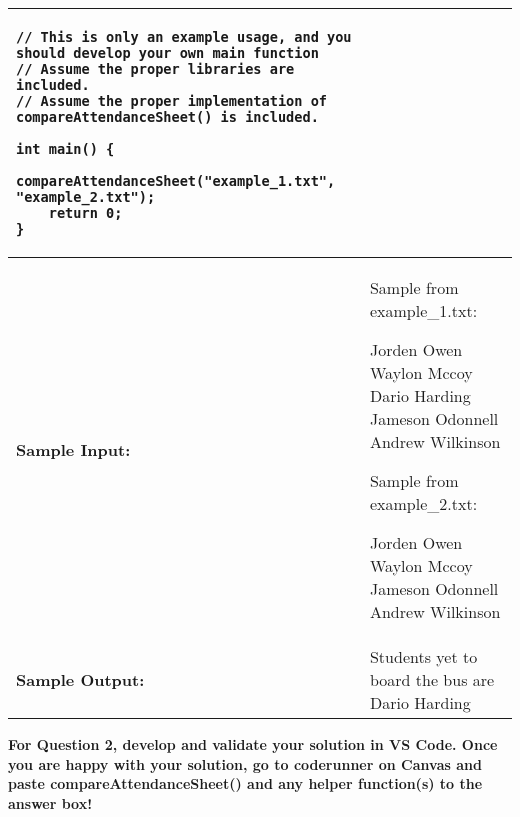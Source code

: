 \begin{longtable}{|p{1.7in}|p{4.3in}|}
\begin{example}
\begin{verbatim}
// This is only an example usage, and you should develop your own main function
// Assume the proper libraries are included.
// Assume the proper implementation of compareAttendanceSheet() is included.

int main() {
    compareAttendanceSheet("example_1.txt", "example_2.txt");
    return 0;
}
\end{verbatim}
\end{example}
\\ \hline

\textbf{Sample Input:} & 

Sample from example\_1.txt:

\begin{tcolorbox}[colframe=blue, colback=white, boxrule=0.5mm, arc=5mm]
Jorden Owen \newline
Waylon Mccoy \newline
Dario Harding \newline
Jameson Odonnell \newline
Andrew Wilkinson
\end{tcolorbox}

Sample from example\_2.txt:
\begin{tcolorbox}[colframe=blue, colback=white, boxrule=0.5mm, arc=5mm]
Jorden Owen \newline
Waylon Mccoy \newline
Jameson Odonnell \newline
Andrew Wilkinson 
\end{tcolorbox}
\\ \hline

\textbf{Sample Output:} &
Students yet to board the bus are \newline
Dario Harding \newline
\\ \hline
\end{longtable}

\textbf{For Question 2, develop and validate your solution in VS Code. Once you are happy with your solution, go to coderunner on Canvas and paste compareAttendanceSheet() and any helper function(s) to the answer box!}


